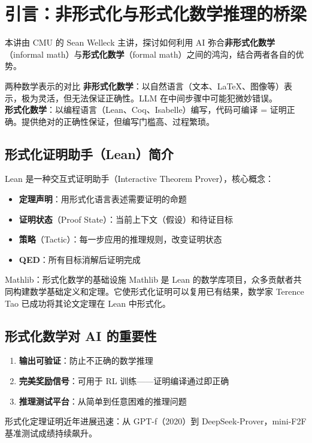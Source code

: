 \section{引言：非形式化与形式化数学推理的桥梁}

本讲由 CMU 的 Sean Welleck 主讲，探讨如何利用 AI 弥合\textbf{非形式化数学}（informal math）与\textbf{形式化数学}（formal math）之间的鸿沟，结合两者各自的优势。

\begin{importantbox}{两种数学表示的对比}
\textbf{非形式化数学}：以自然语言（文本、LaTeX、图像等）表示，极为灵活，但无法保证正确性。LLM 在中间步骤中可能犯微妙错误。\\
\textbf{形式化数学}：以编程语言（Lean、Coq、Isabelle）编写，代码可编译 = 证明正确。提供绝对的正确性保证，但编写门槛高、过程繁琐。
\end{importantbox}

\subsection{形式化证明助手（Lean）简介}

Lean 是一种交互式证明助手（Interactive Theorem Prover），核心概念：
\begin{itemize}
    \item \textbf{定理声明}：用形式化语言表述需要证明的命题
    \item \textbf{证明状态}（Proof State）：当前上下文（假设）和待证目标
    \item \textbf{策略}（Tactic）：每一步应用的推理规则，改变证明状态
    \item \textbf{QED}：所有目标消解后证明完成
\end{itemize}

\begin{knowledgebox}{Mathlib：形式化数学的基础设施}
Mathlib 是 Lean 的数学库项目，众多贡献者共同构建数学基础定义和定理。它使形式化证明可以复用已有结果，数学家 Terence Tao 已成功将其论文定理在 Lean 中形式化。
\end{knowledgebox}

\subsection{形式化数学对 AI 的重要性}

\begin{enumerate}
    \item \textbf{输出可验证}：防止不正确的数学推理
    \item \textbf{完美奖励信号}：可用于 RL 训练——证明编译通过即正确
    \item \textbf{推理测试平台}：从简单到任意困难的推理问题
\end{enumerate}

形式化定理证明近年进展迅速：从 GPT-f（2020）到 DeepSeek-Prover，mini-F2F 基准测试成绩持续飙升。

